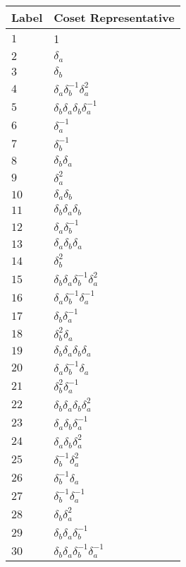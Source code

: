 \documentclass{article}
\begin{document}
\begin{center}
\begin{tabular}{ll}
\toprule
Label & Coset Representative\\
\midrule
$1$ & 1 \\
$2$ & $\delta_a^{}$ \\
$3$ & $\delta_b^{}$ \\
$4$ & $\delta_a^{}\delta_b^{-1}\delta_a^{2}$ \\
$5$ & $\delta_b^{}\delta_a^{}\delta_b^{}\delta_a^{-1}$ \\
$6$ & $\delta_a^{-1}$ \\
$7$ & $\delta_b^{-1}$ \\
$8$ & $\delta_b^{}\delta_a^{}$ \\
$9$ & $\delta_a^{2}$ \\
$10$ & $\delta_a^{}\delta_b^{}$ \\
$11$ & $\delta_b^{}\delta_a^{}\delta_b^{}$ \\
$12$ & $\delta_a^{}\delta_b^{-1}$ \\
$13$ & $\delta_a^{}\delta_b^{}\delta_a^{}$ \\
$14$ & $\delta_b^{2}$ \\
$15$ & $\delta_b^{}\delta_a^{}\delta_b^{-1}\delta_a^{2}$ \\
$16$ & $\delta_a^{}\delta_b^{-1}\delta_a^{-1}$ \\
$17$ & $\delta_b^{}\delta_a^{-1}$ \\
$18$ & $\delta_b^{2}\delta_a^{}$ \\
$19$ & $\delta_b^{}\delta_a^{}\delta_b^{}\delta_a^{}$ \\
$20$ & $\delta_a^{}\delta_b^{-1}\delta_a^{}$ \\
$21$ & $\delta_b^{2}\delta_a^{-1}$ \\
$22$ & $\delta_b^{}\delta_a^{}\delta_b^{}\delta_a^{2}$ \\
$23$ & $\delta_a^{}\delta_b^{}\delta_a^{-1}$ \\
$24$ & $\delta_a^{}\delta_b^{}\delta_a^{2}$ \\
$25$ & $\delta_b^{-1}\delta_a^{2}$ \\
$26$ & $\delta_b^{-1}\delta_a^{}$ \\
$27$ & $\delta_b^{-1}\delta_a^{-1}$ \\
$28$ & $\delta_b^{}\delta_a^{2}$ \\
$29$ & $\delta_b^{}\delta_a^{}\delta_b^{-1}$ \\
$30$ & $\delta_b^{}\delta_a^{}\delta_b^{-1}\delta_a^{-1}$ \\

\end{tabular}
\end{center}
\end{document}
